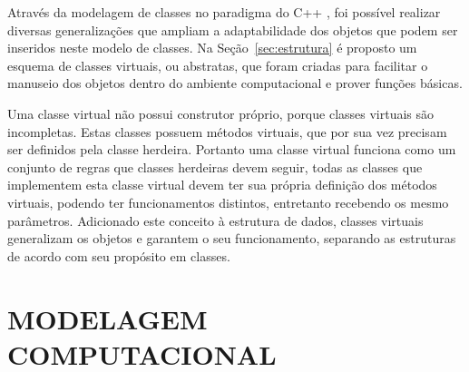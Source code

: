 Através da modelagem de classes no paradigma do C++ \cite{AlanParker}, foi possível realizar diversas generalizações que ampliam a adaptabilidade dos objetos que podem ser inseridos neste modelo de classes. Na Seção~\ref{sec:estrutura} é proposto um esquema de classes virtuais, ou abstratas, que foram criadas para facilitar o manuseio dos objetos dentro do ambiente computacional e prover funções básicas. 

Uma classe virtual não possui construtor próprio, porque classes virtuais são incompletas. Estas classes possuem métodos virtuais, que por sua vez precisam ser definidos pela classe herdeira. Portanto uma classe virtual funciona como um conjunto de regras que classes herdeiras devem seguir, todas as classes que implementem esta classe virtual devem ter sua própria definição dos métodos virtuais, podendo ter funcionamentos distintos, entretanto recebendo os mesmo parâmetros.  Adicionado este conceito à estrutura de dados, classes virtuais generalizam os objetos e garantem o seu funcionamento, separando as estruturas de acordo com seu propósito em classes.


\section{MODELAGEM COMPUTACIONAL}
\label{sec:algoritmo}

